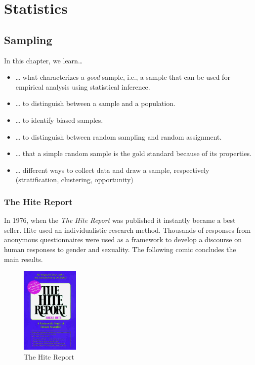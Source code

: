 \documentclass[
  12pt,
  oneside]{book}
\providecommand{\tightlist}{%
  \setlength{\itemsep}{0pt}\setlength{\parskip}{0pt}}
\theoremstyle{definition}
\theoremstyle{definition}
\theoremstyle{definition}
\theoremstyle{definition}
\theoremstyle{remark}
\begin{document}
\hypertarget{statistics}{%
\chapter{Statistics}\label{statistics}}

\hypertarget{sampling}{%
\section{Sampling}\label{sampling}}

In this chapter, we learn\ldots{}

\begin{itemize}
\tightlist
\item
  \ldots{} what characterizes a \emph{good} sample, i.e., a sample that can be used for empirical analysis using statistical inference.
\item
  \ldots{} to distinguish between a sample and a population.
\item
  \ldots{} to identify biased samples.
\item
  \ldots{} to distinguish between random sampling and random assignment.
\item
  \ldots{} that a simple random sample is the gold standard because of its properties.
\item
  \ldots{} different ways to collect data and draw a sample, respectively (stratification, clustering, opportunity)
\end{itemize}

\hypertarget{the-hite-report}{%
\subsection{The Hite Report}\label{the-hite-report}}

In 1976, when the \emph{The Hite Report} \citep[see][]{Hite1976Hite} was published it instantly became a best seller.
Hite used an individualistic research method. Thousands of responses from anonymous questionnaires were used as a framework to develop a discourse on human responses to gender and sexuality. The following comic concludes the main results.

\begin{figure}
\centering
\includegraphics[width=0.25\textwidth,height=\textheight]{fig/hite.jpeg}
\caption{\label{fig:hitereport} The Hite Report}
\end{figure}
\end{document}
